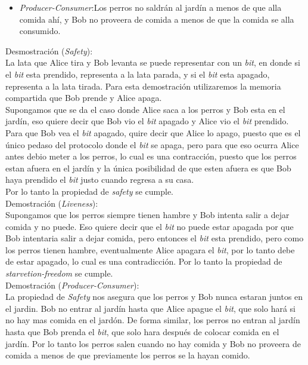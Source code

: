 \documentclass{article}
\begin{document}
\begin{enumerate}
{\begin{itemize}
        \item{\textit{Producer-Consumer}:Los perros no saldrán al jardín a
        menos de que alla comida ahí,  y Bob no proveera de comida a
        menos de que la comida se alla consumido. }
    \end{itemize}
    
    Desmostración (\textit{Safety}):\\
    
    La lata que Alice tira y Bob levanta se puede representar con un
    \textit{bit}, en donde si el \textit{bit} esta prendido,
    representa a la lata parada, y si el \textit{bit} esta apagado,
    representa a la lata tirada. Para esta demostración utilizaremos
    la memoria compartida que Bob prende y Alice apaga.\\
    Supongamos que se da el caso donde Alice saca a los perros y Bob
    esta en el jardín, eso quiere decir que Bob vio el \textit{bit}
    apagado y Alice vio el \textit{bit} prendido. Para que Bob vea el
    \textit{bit} apagado, quire decir que Alice lo apago, puesto que
    es el único pedaso del protocolo donde el \textit{bit} se
    apaga, pero para que eso ocurra Alice antes debio meter a los
    perros, lo cual es una contracción, puesto que los perros estan
    afuera en el jardín y la única posibilidad de que esten afuera es
    que Bob haya prendido el \textit{bit} justo cuando regresa a su
    casa.\\
    Por lo tanto la propiedad de \textit{safety} se cumple.\\
    
    Demostración (\textit{Liveness}):\\
    
    Supongamos que los perros siempre tienen hambre y Bob intenta
    salir a dejar comida y no puede. Eso quiere decir que el
    \textit{bit} no puede estar apagada por que Bob intentaria salir a
    dejar comida, pero entonces el \textit{bit} esta prendido, pero
    como los perros tienen hambre, eventualmente Alice apagara el
    \textit{bit}, por lo tanto debe de estar apagado, lo cual es una
    contradicción. Por lo tanto la propiedad de
    \textit{starvetion-freedom} se cumple.\\

    Demostración (\textit{Producer-Consumer}):\\

    La propiedad de \textit{Safety} nos asegura que los perros y Bob
    nunca estaran juntos en el jardin. Bob no entrar al jardín hasta
    que Alice apague el \textit{bit}, que solo hará si no hay mas
    comida en el jardón. De forma similar, los perros no entran al
    jardín hasta que Bob prenda el \textit{bit}, que solo hara después
    de colocar comida en el jardín. Por lo tanto los perros salen
    cuando no hay comida y Bob no proveera de comida a menos de que
    previamente los perros se la hayan comido.\\
  }
  

\end{enumerate}
\end{document}
